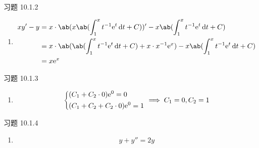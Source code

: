 \begin{problem}
    习题 10.1.2
    \begin{solution}
        \begin{enumerate}
            \item[\textbf{2)}]
            $$
            \begin{aligned}
                x y' - y & = x \cdot \ab(x \ab(\int_1^x t^{-1} \E^{t} \dd{t} + C))' - x \ab(\int_1^x t^{-1} \E^{t} \dd{t} + C) \\
                & = x \cdot \ab(\ab(\int_1^x t^{-1} \E^{t} \dd{t} + C) + x \cdot x^{-1} \E^{x}) - x \ab(\int_1^x t^{-1} \E^{t} \dd{t} + C) \\
                & = x \E^{x}
            \end{aligned}
            $$
        \end{enumerate}
    \end{solution}
\end{problem}

\begin{problem}
    习题 10.1.3
    \begin{solution}
        \begin{enumerate}
            \item[\textbf{1)}]
            $$
            \begin{dcases}
                (C_1 + C_2 \cdot 0) \mathrm{e}^{0} = 0 \\
                (C_1 + C_2 + C_2 \cdot 0) \mathrm{e}^{0} = 1
            \end{dcases} \implies C_1 = 0, C_2 = 1
            $$
        \end{enumerate}
    \end{solution}
\end{problem}

\begin{problem}
    习题 10.1.4
    \begin{solution}
        \begin{enumerate}
            \item[\textbf{2)}]
            $$
            y + y'' = 2y
            $$
        \end{enumerate}
    \end{solution}
\end{problem}

